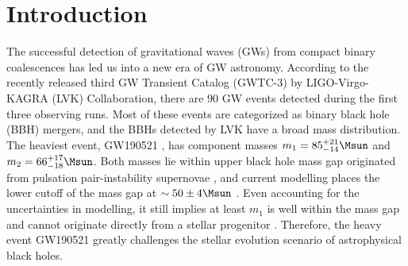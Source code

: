 \documentclass[
reprint,           %
superscriptaddress,%
amsmath,           %
amssymb,           %
aps,               %
prd,               %
notitlepage,       %
longbibliography,  %
floatfix,          %
nofootinbib,
]{revtex4-1}
\begin{document}
\maketitle

\section{Introduction}

The successful detection of gravitational waves (GWs) from compact binary coalescences \cite{LIGOScientific:2018mvr,LIGOScientific:2020ibl,LIGOScientific:2021djp} has led us into a new era of GW astronomy.
According to the recently released third GW Transient Catalog (GWTC-3) \cite{LIGOScientific:2021djp} by LIGO-Virgo-KAGRA (LVK) Collaboration, there are $90$ GW events detected during the first three observing runs. Most of these events are categorized as binary black hole (BBH) mergers, and the BBHs detected by LVK have a broad mass distribution. The heaviest event, GW190521 \cite{LIGOScientific:2020iuh}, has component masses $m_1 = 85^{+21}_{-14}\Msun$ and $m_2 = 66^{+17}_{-18}\Msun$. Both masses lie within upper black hole mass gap originated from pulsation pair-instability supernovae \cite{Marchant_2019}, and current modelling places the lower cutoff of the mass gap at $\sim 50\pm 4\Msun$ \cite{Belczynski:2016jno,Marchant_2019,Farmer_2019,Farmer:2020xne,Marchant:2020haw}.
Even accounting for the uncertainties in modelling, it still implies at least $m_1$ is well within the mass gap and cannot originate directly from a stellar progenitor \cite{Anagnostou:2020umw}.
Therefore, the heavy event GW190521 greatly challenges the stellar evolution scenario of astrophysical black holes.
\end{document}
